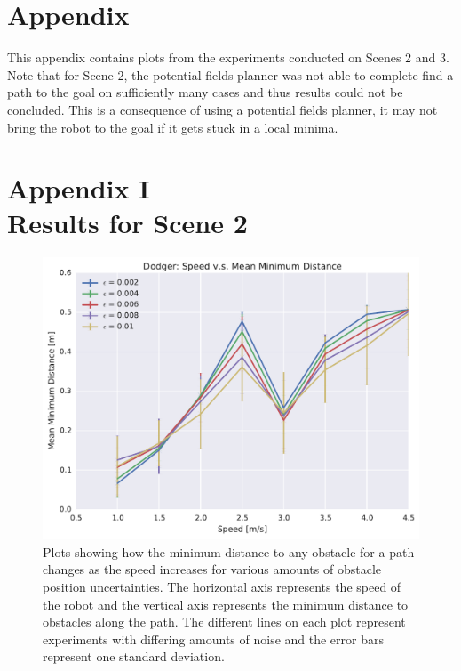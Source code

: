 



\chapter*{Appendix}

\label{chapter:appendix}

This appendix contains plots from the experiments conducted on Scenes 2 and 3.
Note that for Scene 2, the potential fields planner was not able to complete
find a path to the goal on sufficiently many cases and thus results could not
be concluded. This is a consequence of using a potential fields planner, it may
not bring the robot to the goal if it gets stuck in a local minima.

\chapter*{Appendix I\\Results for Scene 2}

\begin{figure}[h!]
    \centering
    \includegraphics[width=0.80\linewidth]{figs/planner_mean_min_distance_1}

    \caption{Plots showing how the minimum distance to any obstacle for a path
        changes as the speed increases for various amounts of obstacle position
        uncertainties.  The horizontal axis represents the speed of the robot
        and the vertical axis represents the minimum distance to obstacles
        along the path. The different lines on each plot represent experiments
    with differing amounts of noise and the error bars represent one standard
deviation.}

\end{figure}

